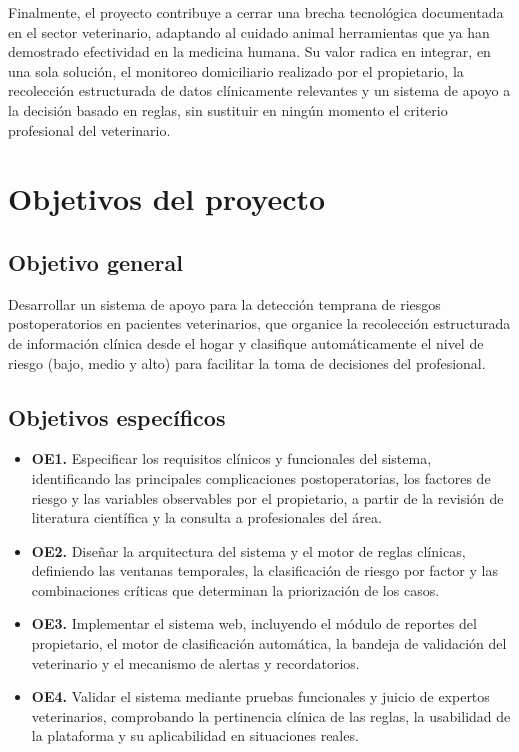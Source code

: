 \documentclass[stu, spanish]{apa7}
\begin{document}
Finalmente, el proyecto contribuye a cerrar una brecha tecnol\'{o}gica documentada en el sector veterinario, adaptando al cuidado animal herramientas que ya han demostrado efectividad en la medicina humana. Su valor radica en integrar, en una sola soluci\'{o}n, el monitoreo domiciliario realizado por el propietario, la recolecci\'{o}n estructurada de datos cl\'{i}nicamente relevantes y un sistema de apoyo a la decisi\'{o}n basado en reglas, sin sustituir en ning\'{u}n momento el criterio profesional del veterinario.

\section{Objetivos del proyecto}

\subsection{Objetivo general}
Desarrollar un sistema de apoyo para la detecci\'{o}n temprana de riesgos postoperatorios en pacientes veterinarios, que organice la recolecci\'{o}n estructurada de informaci\'{o}n cl\'{i}nica desde el hogar y clasifique autom\'{a}ticamente el nivel de riesgo (bajo, medio y alto) para facilitar la toma de decisiones del profesional.

\subsection{Objetivos espec\'{i}ficos}
\begin{itemize}
    \item \textbf{OE1.} Especificar los requisitos cl\'{i}nicos y funcionales del sistema, identificando las principales complicaciones postoperatorias, los factores de riesgo y las variables observables por el propietario, a partir de la revisi\'{o}n de literatura cient\'{i}fica y la consulta a profesionales del \'{a}rea.
    \item \textbf{OE2.} Dise\~{n}ar la arquitectura del sistema y el motor de reglas cl\'{i}nicas, definiendo las ventanas temporales, la clasificaci\'{o}n de riesgo por factor y las combinaciones cr\'{i}ticas que determinan la priorizaci\'{o}n de los casos.
    \item \textbf{OE3.} Implementar el sistema web, incluyendo el m\'{o}dulo de reportes del propietario, el motor de clasificaci\'{o}n autom\'{a}tica, la bandeja de validaci\'{o}n del veterinario y el mecanismo de alertas y recordatorios.
    \item \textbf{OE4.} Validar el sistema mediante pruebas funcionales y juicio de expertos veterinarios, comprobando la pertinencia cl\'{i}nica de las reglas, la usabilidad de la plataforma y su aplicabilidad en situaciones reales.
\end{itemize}
\end{document}
